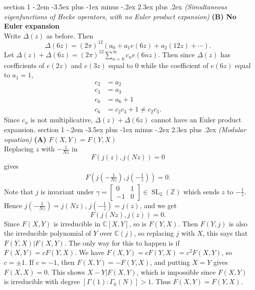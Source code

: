 \documentclass[12pt]{article}
\makeatletter
\theoremstyle{norm}
\newcommand{\C}[0]{\mathbb{C}}
\newcommand{\Z}[0]{\mathbb{Z}}
\newcommand{\rc}[1]{\frac{1}{#1}}
\newcommand{\ga}[0]{\gamma}
\newcommand{\Ga}[0]{\Gamma}
\newcommand{\De}[0]{\Delta}
\newcommand{\pa}[1]{\left( {#1} \right)}
\newcommand{\subprob}[1]{\noindent\textbf{#1}\\}
\newcommand{\SL}{\operatorname{SL}}
\newcommand{\smatt}[4]{
\left[
\begin{smallmatrix}
{#1}&{#2}\\
{#3}&{#4}
\end{smallmatrix}
\right]}
\newcommand{\iy}[0]{\infty}
\newenvironment{problem}{\@startsection
       {section}
       {1}
       {-.2em}
       {-3.5ex plus -1ex minus -.2ex}
       {2.3ex plus .2ex}
       {\pagebreak[3]%
       \large\bf\noindent{Problem }
       }
       }
       {%
       }
\makeatother
\begin{document}
\begin{problem}{\it (Simultaneous eigenfunctions of Hecke operators, with no Euler product expansion)}
\subprob{(B) No Euler expansion}
Write $\De(z)$ as before. Then
\[
\De(6z)=(2\pi)^{12}(a_0+a_1e(6z)+a_2(12z)+\cdots ).
\]
Let $\De(z)+\De(6z)=(2\pi)^{12}\sum_{n=0}^{\iy} c_n e(6nz)$. Then since $\De(z)$ has coefficients of $e(2z)$ and $e(3z)$ equal to 0 while the coefficient of $e(6z)$ equal to $a_1=1$, 
\begin{align*}
c_2&=a_2\\
c_3&=a_3\\
c_6&=a_6+1\\
c_6&=c_2c_3+1\neq c_2c_3.
\end{align*}
Since $c_n$ is not multiplicative, $\De(z)+\De(6z)$ cannot have an Euler product expansion.
\end{problem}
\begin{problem}{\it (Modular equation)}
\subprob{(A) $F(X,Y)=F(Y,X)$}
Replacing $z$ with $-\rc{Nz}$ in 
\[
F(j(z),j(Nz))=0
\]
gives
\begin{align*}
F\pa{
j\pa{-\rc{Nz}},j\pa{-\rc z}
}=0.
\end{align*}
Note that $j$ is invariant under $\ga=\smatt0{1}{-1}0\in \SL_2(\Z)$ which sends $z$ to $-\rc{z}$. Hence $j\pa{-\rc{Nz}}=j(Nz)$, $j\pa{-\rc z}=j(z)$, and we get
\[
F(j(Nz),j(z))=0.
\]
Since $F(X,Y)$ is irreducible in $\C[X,Y]$, so is $F(Y,X)$. 
Then $F(Y,j)$ is also the irreducible polynomial of $Y$ over $\C(j)$, so replacing $j$ with $X$, this says that $F(Y,X)|F(X,Y)$. The only way for this to happen is if $F(X,Y)=cF(Y,X)$. We have $F(X,Y)=cF(Y,X)=c^2F(X,Y)$, so $c=\pm 1$. If $c=-1$, then $F(X,Y)=-F(Y,X)$, and putting $X=Y$ gives $F(X,X)=0$. This shows $X-Y|F(X,Y)$, which is impossible since $F(X,Y)$ is irreducible with degree $[\Ga(1):\Ga_0(N)]>1$. Thus $F(X,Y)=F(Y,X)$.\\


\end{problem}
\end{document}
